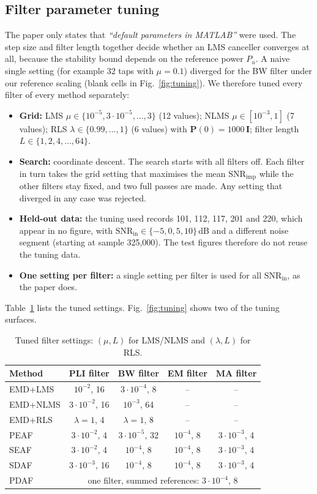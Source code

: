 \documentclass[11pt,a4paper]{article}
\newcommand{\snrin}{\mathrm{SNR}_\mathrm{in}}
\newcommand{\snrimp}{\mathrm{SNR}_\mathrm{imp}}
\begin{document}
\subsection{Filter parameter tuning}
\label{sec:tuning}
The paper only states that \emph{``default parameters in MATLAB''} were used. The step size and filter length
together decide whether an LMS canceller converges at all, because the stability bound depends on the reference power
$P_u$. A naive single setting (for example 32 taps with $\mu=0.1$) diverged for the BW filter under our reference
scaling (blank cells in Fig.~\ref{fig:tuning}). We therefore tuned every filter of every method separately:
\begin{itemize}
  \item \textbf{Grid:} LMS $\mu\in\{10^{-5},3{\cdot}10^{-5},\dots,3\}$ (12 values); NLMS $\mu\in[10^{-3},1]$
        (7 values); RLS $\lambda\in\{0.99,\dots,1\}$ (6 values) with $\mathbf{P}(0)=1000\,\mathbf{I}$; filter length
        $L\in\{1,2,4,\dots,64\}$.
  \item \textbf{Search:} coordinate descent. The search starts with all filters off. Each filter in turn takes the grid
        setting that maximises the mean $\snrimp$ while the other filters stay fixed, and two full passes are made.
        Any setting that diverged in any case was rejected.
  \item \textbf{Held-out data:} the tuning used records 101, 112, 117, 201 and 220, which appear in no figure, with
        $\snrin\in\{-5,0,5,10\}$\,dB and a different noise segment (starting at sample 325{,}000). The test
        figures therefore do not reuse the tuning data.
  \item \textbf{One setting per filter:} a single setting per filter is used for all $\snrin$, as the paper does.
\end{itemize}
Table~\ref{tab:params} lists the tuned settings. Fig.~\ref{fig:tuning} shows two of the tuning surfaces.

\begin{table}[!htbp]
\centering\small
\caption{Tuned filter settings: $(\mu, L)$ for LMS/NLMS and $(\lambda, L)$ for RLS.}
\label{tab:params}
\begin{tabular}{lcccc}
\toprule
Method & PLI filter & BW filter & EM filter & MA filter\\
\midrule
EMD+LMS  & $10^{-2}$, 16 & $3{\cdot}10^{-4}$, 8 & -- & -- \\
EMD+NLMS & $3{\cdot}10^{-2}$, 16 & $10^{-3}$, 64 & -- & -- \\
EMD+RLS  & $\lambda{=}1$, 4 & $\lambda{=}1$, 8 & -- & -- \\
PEAF     & $3{\cdot}10^{-2}$, 4 & $3{\cdot}10^{-5}$, 32 & $10^{-4}$, 8 & $3{\cdot}10^{-3}$, 4 \\
SEAF     & $3{\cdot}10^{-2}$, 4 & $10^{-4}$, 8 & $10^{-4}$, 8 & $3{\cdot}10^{-3}$, 4 \\
SDAF     & $3{\cdot}10^{-3}$, 16 & $10^{-4}$, 8 & $10^{-4}$, 8 & $3{\cdot}10^{-3}$, 4 \\
PDAF     & \multicolumn{4}{c}{one filter, summed references: $3{\cdot}10^{-4}$, 8}\\
\bottomrule
\end{tabular}
\end{table}
\end{document}
